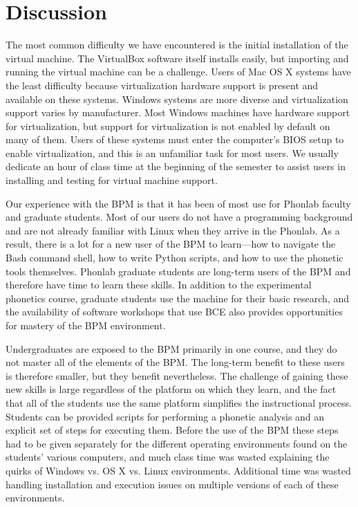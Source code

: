 \documentclass[a4paper]{article}
\begin{document}
  \section{Discussion}
  The most common difficulty we have encountered is the initial installation of the virtual machine. The VirtualBox software itself installs easily, but importing and running the virtual machine can be a challenge. Users of Mac OS X systems have the least difficulty because virtualization hardware support is present and available on these systems. Windows systems are more diverse and virtualization support varies by manufacturer. Most Windows machines have hardware support for virtualization, but support for virtualization is not enabled by default on many of them. Users of these systems must enter the computer's BIOS setup to enable virtualization, and this is an unfamiliar task for most users. We usually dedicate an hour of class time at the beginning of the semester to assist users in installing and testing for virtual machine support.

  Our experience with the BPM is that it has been of most use for Phonlab faculty and graduate students. Most of our users do not have a programming background and are not already familiar with Linux when they arrive in the Phonlab. As a result, there is a lot for a new user of the BPM to learn---how to navigate the Bash command shell, how to write Python scripts, and how to use the phonetic tools themselves. Phonlab graduate students are long-term users of the BPM and therefore have time to learn these skills. In addition to the experimental phonetics course, graduate students use the machine for their basic research, and the availability of software workshops that use BCE also provides opportunities for mastery of the BPM environment.

  Undergraduates are exposed to the BPM primarily in one course, and they do not master all of the elements of the BPM. The long-term benefit to these users is therefore smaller, but they benefit nevertheless. The challenge of gaining these new skills is large regardless of the platform on which they learn, and the fact that all of the students use the same platform simplifies the instructional process. Students can be provided scripts for performing a phonetic analysis and an explicit set of steps for executing them. Before the use of the BPM these steps had to be given separately for the different operating environments found on the students' various computers, and much class time was wasted explaining the quirks of Windows vs. OS X vs. Linux environments. Additional time was wasted handling installation and execution issues on multiple versions of each of these environments.
\end{document}
